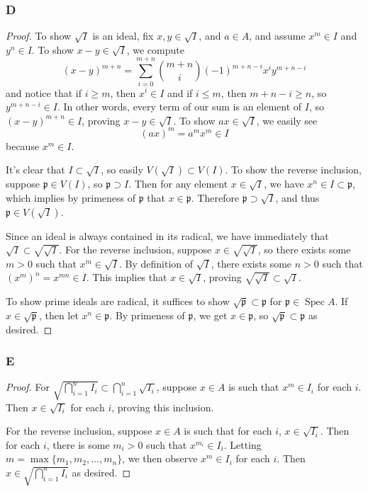 \documentclass{article}
\newcommand{\frkp}{\mathfrak{p}}
\DeclareMathOperator{\Spec}{\mathrm{Spec}}
\theoremstyle{definition} %
\begin{document}
\subsubsection{D}\label{3.4.D}
\begin{proof}
    To show $\sqrt I$ is an ideal, fix $x,y \in \sqrt I$, and $a\in A$, and assume $x^m \in I$ and $y^n\in I$. To show $x-y\in \sqrt I$, we compute
        \[
        (x-y)^{m+n}=\sum_{i=0}^{m+n} \binom{m+n}{i}(-1)^{m+n-i} x^i y^{m+n-i}
        \]
        and notice that if $i\geq m$, then $x^i\in I$ and if $i\le m$, then $m+n-i\ge n$, so $y^{m+n-i} \in I$. In other words, every term of our sum is an element of $I$, so $(x-y)^{m+n}\in I$, proving $x-y\in \sqrt I$. To show $ax\in \sqrt I$, we easily see
        \[
        (ax)^m=a^m x^m \in I
        \]
        because $x^m\in I$.

        It's clear that $I\subset \sqrt I$, so easily $V(\sqrt I)\subset V(I)$. To show the reverse inclusion, suppose $\frkp \in V(I)$, so $\frkp \supset I$. Then for any element $x\in \sqrt I$, we have $x^n \in I \subset \frkp$, which implies by primeness of $\frkp$ that $x\in \frkp$. Therefore $\frkp \supset \sqrt I$, and thus $\frkp \in V(\sqrt I)$.

        Since an ideal is always contained in its radical, we have immediately that $\sqrt I \subset \sqrt{\sqrt I}.$ For the reverse inclusion, suppose $x\in \sqrt{\sqrt I}$, so there exists some $m>0$ such that $x^m \in \sqrt I$. By definition of $\sqrt I$, there exists some $n>0$ such that $(x^m)^n = x^{mn} \in I$. This implies that $x\in \sqrt{I}$, proving $\sqrt{\sqrt{I}}\subset \sqrt{I}$.

        To show prime ideals are radical, it suffices to show $\sqrt{\frkp}\subset \frkp$ for $\frkp \in \Spec A$. If $x\in \sqrt{\frkp}$, then let $x^n \in \frkp$. By primeness of $\frkp$, we get $x\in \frkp$, so $\sqrt{\frkp}\subset \frkp$ as desired.
\end{proof}
\subsubsection{E}\label{3.4.E}
\begin{proof}
    For $\sqrt{\bigcap_{i=1}^n I_i} \subset  \bigcap_{i=1}^n \sqrt{I_i}$, suppose $x\in A$ is such that $x^m \in I_i$ for each $i$. Then $x \in \sqrt{I_i}$ for each $i$, proving this inclusion.

    For the reverse inclusion, suppose $x\in A$ is such that for each $i$, $x\in \sqrt{I_i}$. Then for each $i$, there is some $m_i>0$ such that $x^{m_i} \in I_i$. Letting $m=\max \{m_1,m_2,\dots,m_n\}$, we then observe $x^m \in I_i$ for each $i$. Then $x\in \sqrt{\bigcap_{i=1}^n I_i}$ as desired.
\end{proof}
\end{document}
